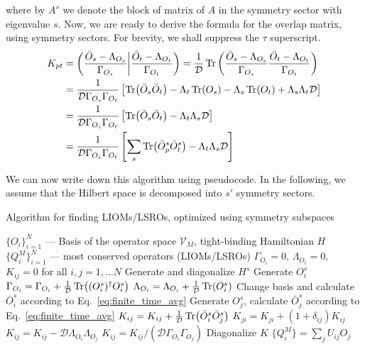   where by \(A^s\) we denote the block of matrix of \(A\) in the symmetry sector with eigenvalue \(s\).
  Now, we are ready to derive the formula for the overlap matrix, using symmetry sectors. For brevity,
  we shall suppress the \(\tau\) superscript.
  \begin{align}
    K_{pt} &= \left(\frac{\bar{O}_s - \Lambda_{O_s}}{\Gamma_{O_s}} \middle| \frac{\bar{O}_t - \Lambda_{O_t}}{\Gamma_{O_t}}\right)
    = \frac{1}{\mathcal{D}} \Tr\left(\frac{\bar{O}_s - \Lambda_{O_s}}{\Gamma_{O_s}}\frac{\bar{O}_t - \Lambda_{O_t}}{\Gamma_{O_t}}\right) \nonumber \\
    &= \frac{1}{\mathcal{D} \Gamma_{O_s}\Gamma_{O_t}} \left[\Tr(\bar{O}_s \bar{O}_t) - \Lambda_t \Tr(O_s) - \Lambda_s \Tr(O_t) + \Lambda_s \Lambda_t \mathcal{D} \right]\nonumber\\
    &= \frac{1}{\mathcal{D} \Gamma_{O_s}\Gamma_{O_t}} \left[\Tr(\bar{O}_s \bar{O}_t) - \Lambda_t \Lambda_s \mathcal{D} \right] \nonumber\\
    &= \frac{1}{\mathcal{D} \Gamma_{O_s}\Gamma_{O_t}} \left[\sum_s \Tr(\bar{O}_p^s \bar{O}_t^s) - \Lambda_t \Lambda_s \mathcal{D} \right]
  \end{align}

  We can now write down this algorithm using pseudocode. In the following, we assume that the Hilbert
  space is decomposed into \(s'\) symmetry sectors.
\begin{algorithm}
	\algrenewcommand{}
	\algrenewcommand{}
	\caption{Algorithm for finding LIOMs/LSROs, optimized using symmetry subspaces}
	\label{alg:liom_alg}
	\begin{algorithmic}[1]
	\Require  \(\{O_i\}_{i=1}^N\) --- Basis of the operator space \(\mathcal{V}_M\), tight-binding Hamiltonian \(H\)
	\Ensure \(\{Q^M_i\}_{i=1}^N\) --- most conserved operators (LIOMs/LSROs)
    \State \(\Gamma_{O_i} = 0\), \(\Lambda_{O_i} = 0\), \(K_{ij} = 0\) for all \(i,j = 1,\ldots N\)
      \State Generate and diagonalize \(H^s\)
        \State Generate \(O_i^s\)
        \State \(\Gamma_{O_i} = \Gamma_{O_i} + \frac{1}{\mathcal{D}}\Tr((O_i^s)^{\dag}O_i^s)\)
        \State \(\Lambda_{O_i} = \Lambda_{O_i} + \frac{1}{\mathcal{D}}\Tr(O_i^s)\)
        \State Change basis and calculate \(\bar{O}_i^s\) according to Eq.~\eqref{eq:finite_time_avg}
          \State Generate \(O_j^s\), calculate \(\bar{O}_j^s\) according to Eq.~\eqref{eq:finite_time_avg}
          \State \(K_{ij} = K_{ij} + \frac{1}{\mathcal{D}}\Tr(\bar{O}_i^s \bar{O}_j^s)\)
          \State \(K_{ji} = K_{ji} + (1 + \delta_{ij}) K_{ij}\)
        \EndFor
      \EndFor
    \EndFor
      \State \(K_{ij} = K_{ij} - \mathcal{D} \Lambda_{O_i} \Lambda_{O_j}\)
      \State \(K_{ij} = K_{ij}/(\mathcal{D} \Gamma_{O_i} \Gamma_{O_j})\)
    \EndFor
    \State Diagonalize \(K\)
    \State \(\{Q_i^M\} = \sum_j U_{ij} O_j\)
  \end{algorithmic}
\end{algorithm}

